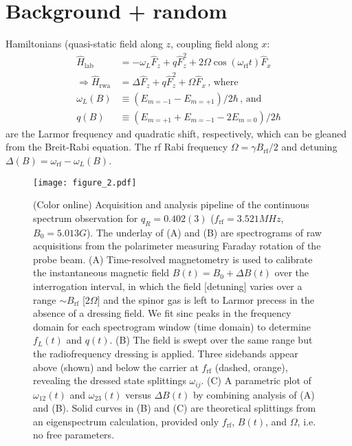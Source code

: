 \documentclass[aps,prl,reprint,superscriptaddress,floatfix]{revtex4-1}
\begin{document}
\section{Background + random}
\label{sec:background}
Hamiltonians (quasi-static field along $z$, coupling field along $x$:
    \begin{align*}
        \hat{H}_{\text{lab}} &= -\omega_L \hat{F}_z + q \hat{F}_z^2 + 2\Omega \cos (\omega_{\text{rf}} t) \hat{F}_x \\
        \Rightarrow \hat{H}_{\text{rwa}} &= \Delta \hat{F}_z + q \hat{F}_z^2 + \Omega \hat{F}_x \, \text{, where} \\
        \omega_L(B) &\equiv (E_{m=-1} - E_{m=+1})/2\hbar \, \text{, and} \\
        q(B) &\equiv (E_{m=+1} + E_{m=-1} - 2 E_{m=0})/2\hbar
    \end{align*}
    are the Larmor frequency and quadratic shift, respectively, which can be gleaned from the Breit-Rabi equation.
    The rf Rabi frequency $\Omega = \gamma B_{\text{rf}}/2$ and detuning $\Delta(B) = \omega_{\text{rf}} - \omega_L(B)$.

\begin{figure}
    \centering
    \texttt{[image: figure\_2.pdf]}
    \caption{
    \label{fig:acquisition_pipeline}
        (Color online)
        Acquisition and analysis pipeline of the continuous spectrum observation for $q_R = 0.402(3)$ ($f_{\text{rf}}=3.521\unit{MHz}$, $B_0=5.013\unit{G}$).
        The underlay of (A) and (B) are spectrograms of raw acquisitions from the polarimeter measuring Faraday rotation of the probe beam.
        (A) Time-resolved magnetometry is used to calibrate the instantaneous magnetic field $B(t) = B_0 + \Delta B(t)$ over the interrogation interval, in which the field [detuning] varies over a range $\sim B_{\text{rf}}$ [$2\Omega$] and the spinor gas is left to Larmor precess in the absence of a dressing field.
        We fit sinc peaks in the frequency domain for each spectrogram window (time domain) to determine $f_L(t)$ and $q(t)$.
       (B) The field is swept over the same range but the radiofrequency dressing is applied.
       Three sidebands appear above (shown) and below the carrier at $f_{\text{rf}}$ (dashed, orange), revealing the dressed state splittings $\omega_{ij}$.
       (C) A parametric plot of $\omega_{12}(t)$ and $\omega_{23}(t)$ versus $\Delta B(t)$ by combining analysis of (A) and (B).
       Solid curves in (B) and (C) are theoretical splittings from an eigenspectrum calculation, provided only $f_{\text{rf}}$, $B(t)$, and $\Omega$, i.e. no free parameters.
    }
\end{figure}
\end{document}
